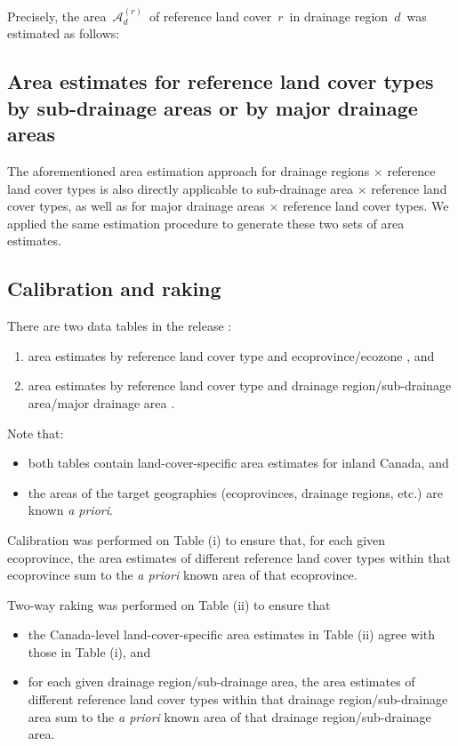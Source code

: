 \vskip 0.3cm
\noindent
Precisely, the area \,$\mathcal{A}^{(r)}_{d}$\, of reference land cover \,$r$\,
in drainage region \,$d$\, was estimated as follows:
\vskip -0.3cm



\subsection{Area estimates for reference land cover types by sub-drainage areas or by major 
drainage areas}
The aforementioned area estimation approach for drainage regions $\times$
reference land cover types is also directly applicable to sub-drainage area $\times$
reference land cover types, as well as for major drainage areas $\times$ reference land cover types.
We applied the same estimation procedure to generate these two sets of area estimates. 


\subsection{Calibration and raking} 
There are two data tables in the release \cite{StatCanCoELandCoverArea2025}:
\renewcommand{\theenumi}{(\roman{enumi})}
\renewcommand{\labelenumi}{\mbox{}\;\theenumi$\;$}
\begin{enumerate}
\item
    area estimates by reference land cover type and
    ecoprovince/ecozone \cite{StatCanCoELandCoverAreaEcoprovinces}, and
\item
    area estimates by reference land cover type and
    drainage region/sub-drainage area/major drainage area \cite{StatCanCoELandCoverAreaDrainageRegions}.
\end{enumerate}
Note that:
\begin{itemize}
\item
    both tables contain land-cover-specific area estimates for inland Canada, and
\item
    the areas of the target geographies (ecoprovinces, drainage regions, etc.) are known \textit{a priori}.
\end{itemize}

\vskip 0.3cm
\noindent
Calibration was performed on Table (i)
to ensure that, for each given ecoprovince,
the area estimates of different reference land cover types
within that ecoprovince
sum to the \textit{a priori} known area of that ecoprovince.

\vskip 0.5cm
\noindent
Two-way raking was performed on Table (ii) to ensure that 
\begin{itemize}
\item
    the Canada-level land-cover-specific area estimates in Table (ii) agree with those in Table (i), and
\item
    for each given drainage region/sub-drainage area,
    the area estimates of different reference land cover types within that drainage region/sub-drainage area
    sum to the \textit{a priori} known area of that drainage region/sub-drainage area.
\end{itemize}

